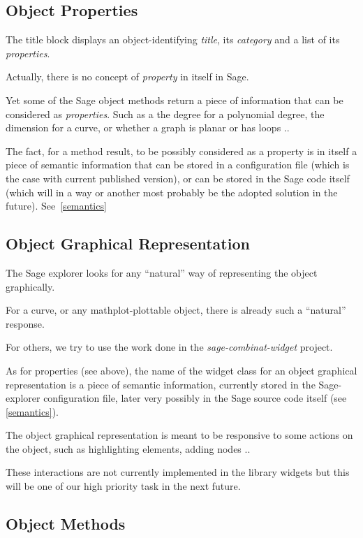 \documentclass{deliverablereport}
\begin{document}
\subsection{Object Properties}

The title block displays an object-identifying \emph{title}, its
\emph{category} and a list of its \emph{properties}.

Actually, there is no concept of \emph{property} in itself in Sage.

Yet some of the Sage object methods return a piece of information that
can be considered as \emph{properties}. Such as a the degree for a
polynomial degree, the dimension for a curve, or whether a graph is
planar or has loops ..

The fact, for a method result, to be possibly considered as a property
is in itself a piece of semantic information that can be stored in a
configuration file (which is the case with current published version),
or can be stored in the Sage code itself (which will in a way or
another most probably be the adopted solution in the future). See~\ref{semantics}

\subsection{Object Graphical Representation}
\label{representation}

The Sage explorer looks for any ``natural'' way of representing the
object graphically.

For a curve, or any mathplot-plottable object, there is already such a
``natural'' response.

For others, we try to use the work done in the
\emph{sage-combinat-widget} project.

As for properties (see above), the name of the widget class for an
object graphical representation is a piece of semantic information,
currently stored in the Sage-explorer configuration file, later very
possibly in the Sage source code itself (see \ref{semantics}).

The object graphical representation is meant to be responsive to some
actions on the object, such as highlighting elements, adding nodes ..

These interactions are not currently implemented in the library widgets but
this will be one of our high priority task in the next future.

\subsection{Object Methods}
\end{document}
